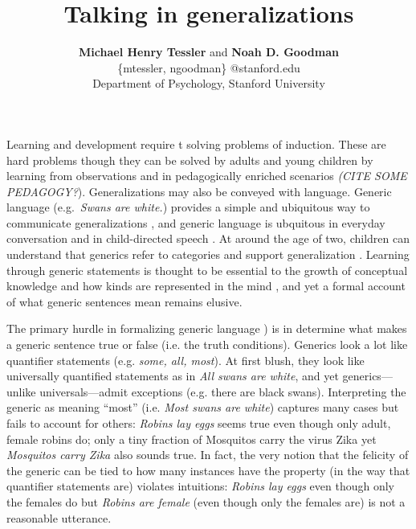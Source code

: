 \documentclass[11pt,letterpaper]{article}
\title{Talking in generalizations}
\author{{\large \bf Michael Henry Tessler} and {\large \bf Noah D. Goodman} \\
\{mtessler, ngoodman\} @stanford.edu\\
  Department of Psychology, Stanford University}
\begin{document}
\maketitle

Learning and development require t solving problems of induction.
These are hard problems though they can be solved by adults and young children by learning from observations \cite{Markman1989} 
and in pedagogically enriched scenarios \emph{(CITE SOME PEDAGOGY?}).
Generalizations may also be conveyed with language.
Generic language (e.g.~\emph{Swans are white.}) provides a simple and ubiquitous way to communicate generalizations \cite{Carlson1977, Leslie2008}, and generic language is ubquitous in everyday conversation and in child-directed speech \cite{Gelman2008}. 
At around the age of two, children can understand that generics refer to categories and support generalization \cite{Cimpian2008}.
Learning through generic statements is thought to be essential to the growth of conceptual knowledge \cite{Gelman2004} and how kinds are represented in the mind \cite{Leslie2008}, and yet a formal account of what generic sentences mean remains elusive. 

The primary hurdle in formalizing generic language ) is in determine what makes a generic sentence true or false (i.e. the truth conditions).
Generics look a lot like quantifier statements (e.g. \emph{some, all, most}).
At first blush, they look like universally quantified statements as in \emph{All swans are white}, and yet generics---unlike universals---admit exceptions (e.g. there are black swans). 
Interpreting the generic as meaning ``most'' (i.e. \emph{Most swans are white}) captures many cases but fails to account for others: \emph{Robins lay eggs} seems true even though only adult, female robins do; only a tiny fraction of Mosquitos carry the virus Zika yet \emph{Mosquitos carry Zika} also sounds true. 
In fact, the very notion that the felicity of the generic can be tied to how many instances have the property (in the way that quantifier statements are) violates intuitions: \emph{Robins lay eggs} even though only the females do but \emph{Robins are female} (even though only the females are) is not a reasonable utterance.
\end{document}
